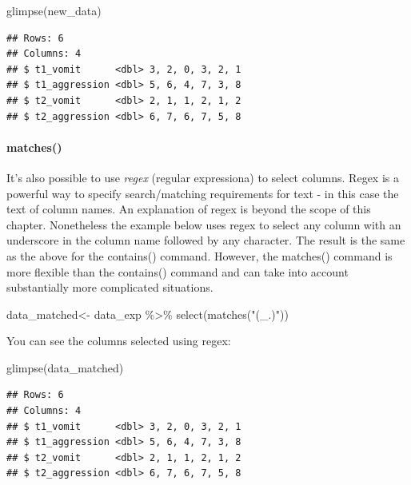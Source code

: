 \documentclass[
]{krantz}
\makeatletter
\newenvironment{Shaded}{\begin{snugshade}}{\end{snugshade}}
\newcommand{\FunctionTok}[1]{\textcolor[rgb]{0,0,0}{#1}}
\newcommand{\NormalTok}[1]{#1}
\newcommand{\OtherTok}[1]{\textcolor[rgb]{0.37,0.37,0.37}{#1}}
\newcommand{\SpecialCharTok}[1]{\textcolor[rgb]{0,0,0}{#1}}
\newcommand{\StringTok}[1]{\textcolor[rgb]{0.5,0.5,0.5}{#1}}
\newenvironment{kframe}{%
\medskip{}
\setlength{\fboxsep}{.8em}
 \def\at@end@of@kframe{}%
 \ifinner\ifhmode%
  \def\at@end@of@kframe{\end{minipage}}%
  \begin{minipage}{\columnwidth}%
 \fi\fi%
 \def\FrameCommand##1{\hskip\@totalleftmargin \hskip-\fboxsep
 \colorbox{shadecolor}{##1}\hskip-\fboxsep
     \hskip-\linewidth \hskip-\@totalleftmargin \hskip\columnwidth}%
 \MakeFramed {\advance\hsize-\width
   \@totalleftmargin\z@ \linewidth\hsize
   \@setminipage}}%
 {\par\unskip\endMakeFramed%
 \at@end@of@kframe}
\renewenvironment{Shaded}{\begin{kframe}}{\end{kframe}}
\makeatother
\begin{document}
\begin{Shaded}
\begin{Highlighting}[]
\FunctionTok{glimpse}\NormalTok{(new\_data)}
\end{Highlighting}
\end{Shaded}

\begin{verbatim}
## Rows: 6
## Columns: 4
## $ t1_vomit      <dbl> 3, 2, 0, 3, 2, 1
## $ t1_aggression <dbl> 5, 6, 4, 7, 3, 8
## $ t2_vomit      <dbl> 2, 1, 1, 2, 1, 2
## $ t2_aggression <dbl> 6, 7, 6, 7, 5, 8
\end{verbatim}

\hypertarget{matches}{%
\paragraph{matches()}\label{matches}}

It's also possible to use \emph{regex} (regular expressiona) to select columns. Regex is a powerful way to specify search/matching requirements for text - in this case the text of column names. An explanation of regex is beyond the scope of this chapter. Nonetheless the example below uses regex to select any column with an underscore in the column name followed by any character. The result is the same as the above for the contains() command. However, the matches() command is more flexible than the contains() command and can take into account substantially more complicated situations.

\begin{Shaded}
\begin{Highlighting}[]
\NormalTok{data\_matched}\OtherTok{\textless{}{-}}\NormalTok{ data\_exp }\SpecialCharTok{\%\textgreater{}\%} 
  \FunctionTok{select}\NormalTok{(}\FunctionTok{matches}\NormalTok{(}\StringTok{"(\_.)"}\NormalTok{))}
\end{Highlighting}
\end{Shaded}

You can see the columns selected using regex:

\begin{Shaded}
\begin{Highlighting}[]
\FunctionTok{glimpse}\NormalTok{(data\_matched)}
\end{Highlighting}
\end{Shaded}

\begin{verbatim}
## Rows: 6
## Columns: 4
## $ t1_vomit      <dbl> 3, 2, 0, 3, 2, 1
## $ t1_aggression <dbl> 5, 6, 4, 7, 3, 8
## $ t2_vomit      <dbl> 2, 1, 1, 2, 1, 2
## $ t2_aggression <dbl> 6, 7, 6, 7, 5, 8
\end{verbatim}
\end{document}
